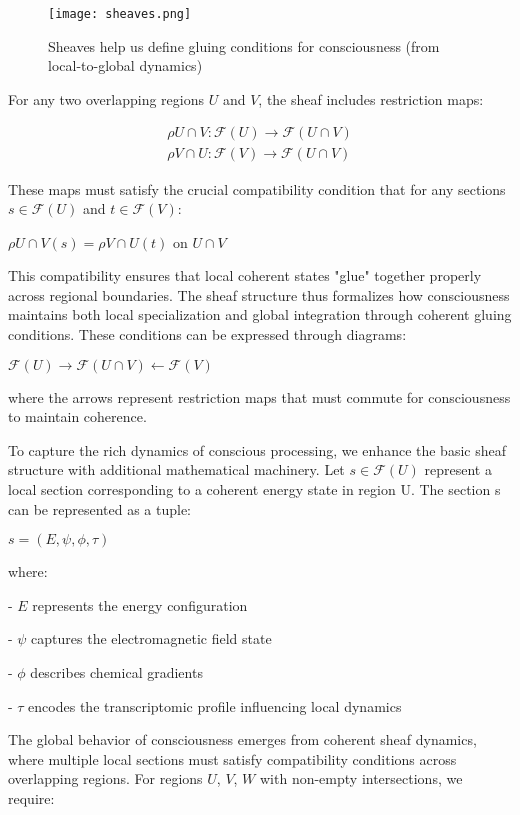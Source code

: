 \begin{refsection}
\begin{figure}[h]
    \centering
    \texttt{[image: sheaves.png]}

    \caption{Sheaves help us define gluing conditions for consciousness (from local-to-global dynamics)}
\end{figure}

For any two overlapping regions $U$ and $V$, the sheaf includes restriction maps:

\begin{align}
\rho U \cap V: \mathcal{F}(U) \rightarrow \mathcal{F}(U \cap V)
\\
\rho V \cap U: \mathcal{F}(V) \rightarrow \mathcal{F}(U \cap V)
\end{align}


These maps must satisfy the crucial compatibility condition that for any sections $s \in \mathcal{F}(U)$ and $t \in \mathcal{F}(V)$:

$\rho U \cap V(s) = \rho V \cap U(t)$ on $U \cap V$

This compatibility ensures that local coherent states "glue" together properly across regional boundaries. The sheaf structure thus formalizes how consciousness maintains both local specialization and global integration through coherent gluing conditions. These conditions can be expressed through diagrams:

$\mathcal{F}(U) \rightarrow \mathcal{F}(U \cap V) \leftarrow \mathcal{F}(V)$

where the arrows represent restriction maps that must commute for consciousness to maintain coherence.

To capture the rich dynamics of conscious processing, we enhance the basic sheaf structure with additional mathematical machinery. Let $s \in \mathcal{F}(U)$ represent a local section corresponding to a coherent energy state in region U. The section s can be represented as a tuple:

$s = (E, \psi, \phi, \tau)$

where:

- $E$ represents the energy configuration

- $\psi$ captures the electromagnetic field state

- $\phi$ describes chemical gradients

- $\tau$ encodes the transcriptomic profile influencing local dynamics

The global behavior of consciousness emerges from coherent sheaf dynamics, where multiple local sections must satisfy compatibility conditions across overlapping regions. For regions $U$, $V$, $W$ with non-empty intersections, we require:


\end{refsection}
